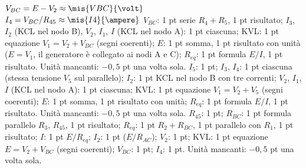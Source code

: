 \begin{esercizio}[12]
\begin{solution}
{  $V_{BC} = E - V_2 \approx \mis{VBC}{\volt}$\\[4pt]
  $I_4 = V_{BC}/R_{45} \approx \mis{I4}{\ampere}$}
  \criterioABC
  {$V_{BC}$: 1 pt serie $R_4+R_5$, 1 pt risultato; $I_3$, $I_2$ (KCL nel nodo B), $V_2$, $I_1$,
    $I$ (KCL nel nodo A): 1 pt ciascuna; KVL: 1 pt equazione $V_1=V_2+V_{BC}$ (segni coerenti);
    $E$: 1 pt somma, 1 pt risultato con unità ($E=V_1$, il generatore è collegato ai nodi A e C);
    $R_{eq}$: 1 pt formula $E/I$, 1 pt risultato. Unità mancanti: $-0{,}5$ pt una volta sola.}
  {$I_5$: 1 pt; $I_3$, $I_4$: 1 pt ciascuna (stessa tensione $V_5$ sul parallelo); $I_2$: 1 pt KCL nel
    nodo B con tre correnti; $V_2$, $I_1$, $I$ (KCL nel nodo A): 1 pt ciascuna; KVL: 1 pt equazione
    $V_1=V_2+V_5$ (segni coerenti); $E$: 1 pt somma, 1 pt risultato con unità;
    $R_{eq}$: 1 pt formula $E/I$, 1 pt risultato. Unità mancanti: $-0{,}5$ pt una volta sola.}
  {$R_{45}$: 1 pt; $R_{BC}$: 1 pt formula parallelo $R_3$, $R_{45}$, 1 pt risultato; $R_{eq}$: 1 pt
    $R_2+R_{BC}$, 1 pt parallelo con $R_1$, 1 pt risultato; $I$: 1 pt $E/R_{eq}$; $I_2$: 1 pt
    ($E/R_{AC}$); $V_2$: 1 pt; KVL: 1 pt equazione $E=V_2+V_{BC}$ (segni coerenti); $V_{BC}$: 1 pt;
    $I_4$: 1 pt. Unità mancanti: $-0{,}5$ pt una volta sola.}
\end{solution}
\end{esercizio}
